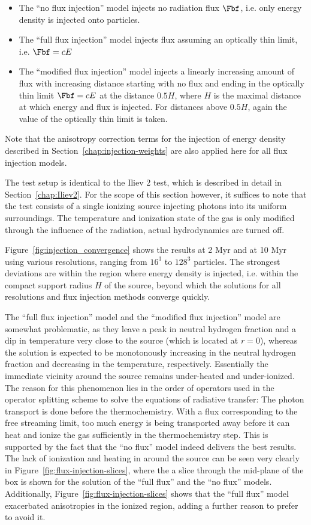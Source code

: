 \begin{itemize}
 \item The ``no flux injection'' model injects no radiation flux $\Fbf$, i.e. only energy density
is injected onto particles.
 \item The ``full flux injection'' model injects flux assuming an optically thin limit, i.e. $\Fbf
= c E$
 \item The ``modified flux injection'' model injects a linearly increasing amount of flux
with increasing distance starting with no flux and ending in the optically thin limit $\Fbf = c E$
at the distance $0.5H$, where $H$ is the maximal distance at which energy and flux is injected. For
distances above $0.5H$, again the value of the optically thin limit is taken.
\end{itemize}

Note that the anisotropy correction terms for the injection of energy density described in
Section~\ref{chap:injection-weights} are also applied here for all flux injection models.

The test setup is identical to the Iliev 2 test, which is described in detail in
Section~\ref{chap:Iliev2}. For the scope of this section however, it suffices to note that the test
consists of a single ionizing source injecting photons into its uniform surroundings. The
temperature and ionization state of the gas is only modified through the influence of the radiation,
actual hydrodynamics are turned off.


Figure~\ref{fig:injection_convergence} shows the results at 2 Myr and at 10 Myr using various
resolutions, ranging from $16^3$ to $128^3$ particles. The strongest deviations are within the
region where energy density is injected, i.e. within the compact support radius $H$ of the source,
beyond which the solutions for all resolutions and flux injection methods converge quickly.

The ``full flux injection'' model and the ``modified flux injection'' model are somewhat
problematic, as they leave a peak in neutral hydrogen fraction and a dip in temperature very close
to the source (which is located at $r = 0$), whereas the solution is expected to be monotonously
increasing in the neutral hydrogen fraction and decreasing in the temperature, respectively.
Essentially the immediate vicinity around the source remains under-heated and under-ionized. The
reason for this phenomenon lies in the order of operators used in the operator splitting scheme to
solve the equations of radiative transfer: The photon transport is done before the thermochemistry.
With a flux corresponding to the free streaming limit, too much energy is being transported away
before it can heat and ionize the gas sufficiently in the thermochemistry step. This is supported by
the fact that the ``no flux'' model indeed delivers the best results. The lack of ionization and
heating in around the source can be seen very clearly in Figure~\ref{fig:flux-injection-slices},
where the a slice through the mid-plane of the box is shown for the solution of the ``full flux'' and
the ``no flux'' models. Additionally, Figure~\ref{fig:flux-injection-slices} shows that the ``full
flux'' model exacerbated anisotropies in the ionized region, adding a further reason to prefer to
avoid it.


